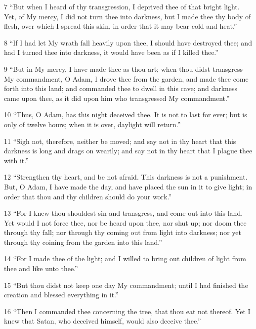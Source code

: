 \par 7 “But when I heard of thy transgression, I deprived thee of that bright light. Yet, of My mercy, I did not turn thee into darkness, but I made thee thy body of flesh, over which I spread this skin, in order that it may bear cold and heat.”

\par 8 “If I had let My wrath fall heavily upon thee, I should have destroyed thee; and had I turned thee into darkness, it would have been as if I killed thee.”

\par 9 “But in My mercy, I have made thee as thou art; when thou didst transgress My commandment, O Adam, I drove thee from the garden, and made thee come forth into this land; and commanded thee to dwell in this cave; and darkness came upon thee, as it did upon him who transgressed My commandment.”

\par 10 “Thus, O Adam, has this night deceived thee. It is not to last for ever; but is only of twelve hours; when it is over, daylight will return.”

\par 11 “Sigh not, therefore, neither be moved; and say not in thy heart that this darkness is long and drags on wearily; and say not in thy heart that I plague thee with it.”

\par 12 “Strengthen thy heart, and be not afraid. This darkness is not a punishment. But, O Adam, I have made the day, and have placed the sun in it to give light; in order that thou and thy children should do your work.”

\par 13 “For I knew thou shouldest sin and transgress, and come out into this land. Yet would I not force thee, nor be heard upon thee, nor shut up; nor doom thee through thy fall; nor through thy coming out from light into darkness; nor yet through thy coining from the garden into this land.”

\par 14 “For I made thee of the light; and I willed to bring out children of light from thee and like unto thee.”

\par 15 “But thou didst not keep one day My commandment; until I had finished the creation and blessed everything in it.”

\par 16 “Then I commanded thee concerning the tree, that thou eat not thereof. Yet I knew that Satan, who deceived himself, would also deceive thee.”

